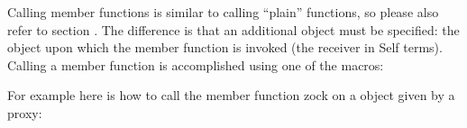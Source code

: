 \documentclass[letterpaper,10pt,english]{sphinxmanual}
\begin{document}
Calling member functions is similar to calling “plain” functions, so please also refer to section
{\hyperref[\detokenize{vmref:calling-c-functions}]{}}. The difference is that an additional object must be specified: the object upon which the
member function is invoked (the receiver in Self terms). Calling a member function is accomplished
using one of the macros:

\begin{sphinxVerbatim}[commandchars=\\\{\}]
   
              
\end{sphinxVerbatim}

For example here is how to call the member function zock on a  object given by a
proxy:

\begin{sphinxVerbatim}[commandchars=\\\{\}]
    
\end{sphinxVerbatim}
\end{document}
